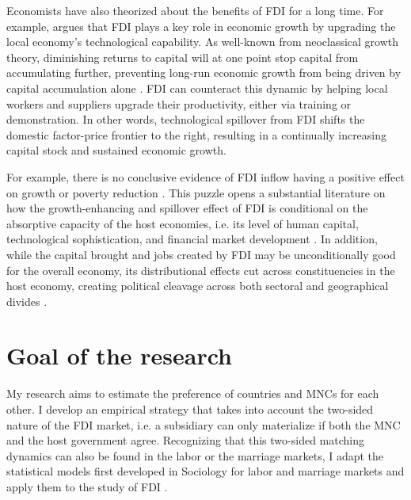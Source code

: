 Economists have also theorized about the benefits of FDI for a long time. For
example, \citet{Findlay1978} argues that FDI plays a key role in economic growth
by upgrading the local economy's technological capability. As well-known from
neoclassical growth theory, diminishing returns to capital will at one point
stop capital from accumulating further, preventing long-run economic growth from
being driven by capital accumulation alone \citep{Solow1956}. FDI can counteract
this dynamic by helping local workers and suppliers upgrade their productivity,
either via training or demonstration. In other words, technological spillover
from FDI shifts the domestic factor-price frontier to the right, resulting in a
continually increasing capital stock and sustained economic growth.

For example, there is no conclusive evidence of FDI inflow having a positive effect on
growth \citep{Nair-Reichert2001, Carkovic2002} or poverty reduction
\citep{Guerra2009}. This puzzle opens a substantial literature on how the
growth-enhancing and spillover effect of FDI is conditional on the absorptive
capacity of the host economies, i.e. its level of human capital, technological
sophistication, and financial market development \citep{Durham2004,
  Nunnenkamp2004, Fu2008, Willem2004}. In addition, while the capital brought
and jobs created by FDI may be unconditionally good for the overall economy, its
distributional effects cut across constituencies in the host economy, creating
political cleavage across both sectoral and geographical divides
\citep{Chintrakarn2012, Goldberg2007, Nunnenkamp2007}.

\section{Goal of the research}

My research aims to estimate the preference of countries and MNCs for each
other. I develop an empirical strategy that takes into account the two-sided
nature of the FDI market, i.e. a subsidiary can only materialize if both the MNC
and the host government agree. Recognizing that this two-sided matching dynamics
can also be found in the labor or the marriage markets, I adapt the statistical
models first developed in Sociology for labor and marriage markets and apply
them to the study of FDI \citep{Logan1996, Logan2008}.

